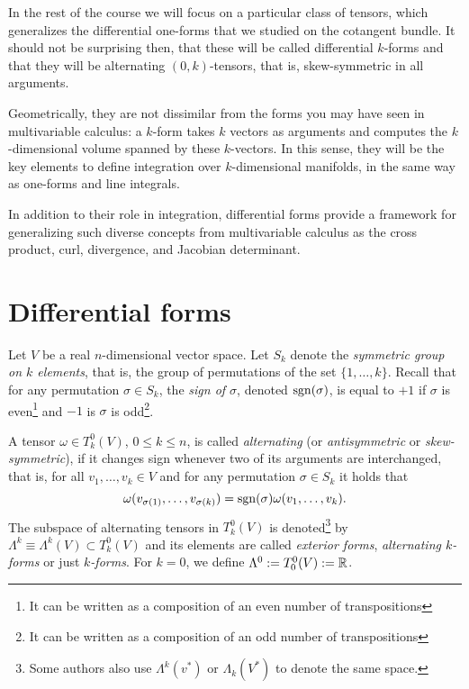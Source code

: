 In the rest of the course we will focus on a particular class of tensors, which generalizes the differential one-forms that we studied on the cotangent bundle.
It should not be surprising then, that these will be called differential $k$-forms and that they will be alternating $(0,k)$-tensors, that is, skew-symmetric in all arguments.

Geometrically, they are not dissimilar from the forms you may have seen in multivariable calculus: a $k$-form takes $k$ vectors as arguments and computes the $k$-dimensional volume spanned by these $k$-vectors.
In this sense, they will be the key elements to define integration over $k$-dimensional manifolds, in the same way as one-forms and line integrals.

In addition to their role in integration, differential forms provide a framework for generalizing such diverse concepts from multivariable calculus as the cross product, curl, divergence, and Jacobian determinant. 

\section{Differential forms}

\begin{definition}
  Let $V$ be a real $n$-dimensional vector space.
  Let $S_k$ denote the \emph{symmetric group on $k$ elements}, that is, the group of permutations of the set $\{1,\ldots,k\}$.
  Recall that for any permutation $\sigma\in S_k$, the \emph{sign of $\sigma$}, denoted $\operatorname{sgn}(\sigma)$, is equal to $+1$ if $\sigma$ is even\footnote{It can be written as a composition of an even number of transpositions} and $-1$ is $\sigma$ is odd\footnote{It can be written as a composition of an odd number of transpositions}.

  A tensor $\omega\in T_k^0(V)$, $0\leq k\leq n$, is called \emph{alternating} (or \emph{antisymmetric} or \emph{skew-symmetric}), if it changes sign whenever two of its arguments are interchanged, that is,
  for all $v_1, \ldots, v_k\in V$ and for any permutation $\sigma\in S_k$ it holds that
  \begin{equation}
    \omega(v_{\sigma(1)}, \ldots, v_{\sigma(k)}) = \operatorname{sgn}(\sigma) \omega(v_1, \ldots, v_k).
  \end{equation}
  The subspace of alternating tensors in $T_k^0(V)$ is denoted\footnote{Some authors also use $\Lambda^k(v^*)$ or $\Lambda_k(V^*)$ to denote the same space.} by $\Lambda^k \equiv \Lambda^k(V) \subset T_k^0(V)$ and its elements are called \emph{exterior forms}, \emph{alternating $k$-forms} or just  \emph{$k$-forms}.
  For $k=0$, we define $\Lambda^0 := T_0^0(V) := \mathbb{R}$.
\end{definition} 

